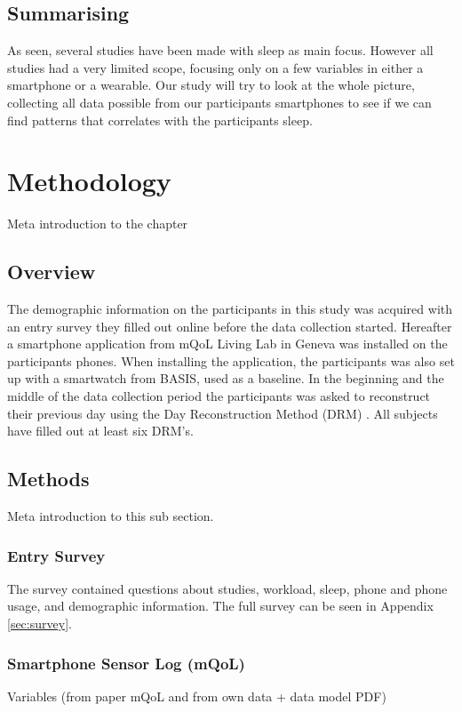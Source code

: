 \documentclass[12pt]{article} %
\begin{document}
\subsection{Summarising}
As seen, several studies have been made with sleep as main focus. However all studies had a very limited scope, focusing only on a few variables in either a smartphone or a wearable. Our study will try to look at the whole picture, collecting all data possible from our participants smartphones to see if we can find patterns that correlates with the participants sleep.   

\newpage
\section{Methodology}
Meta introduction to the chapter

\subsection{Overview}
The demographic information on the participants in this study was acquired with an entry survey they filled out online before the data collection started. Hereafter a smartphone application from mQoL Living Lab in Geneva \cite{mQOL} was installed on the participants phones. When installing the application, the participants was also set up with a smartwatch from BASIS, used as a baseline. In the beginning and the middle of the data collection period the participants was asked to reconstruct their previous day using the Day Reconstruction Method (DRM) \cite{drm}. All subjects have filled out at least six DRM's. 

\subsection{Methods}
Meta introduction to this sub section. 

\subsubsection{Entry Survey}
The survey contained questions about studies, workload, sleep, phone and phone usage, and demographic information. The full survey can be seen in Appendix \ref{sec:survey}. 

\subsubsection{Smartphone Sensor Log (mQoL)}
Variables (from paper mQoL and from own data + data model PDF)
\end{document}
